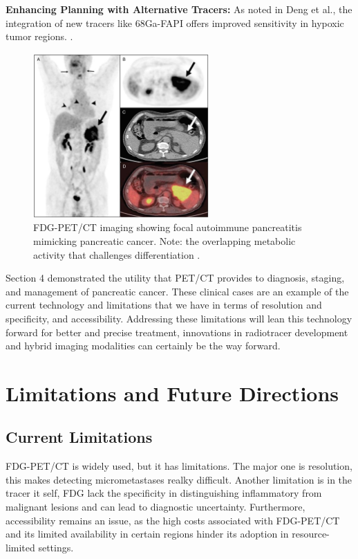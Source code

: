 \documentclass[11pt]{article} %
\begin{document}
\textbf{Enhancing Planning with Alternative Tracers:} As noted in Deng et al., the integration of new tracers like 68Ga-FAPI offers improved sensitivity in hypoxic tumor regions. \cite{Deng2021}.

\begin{figure}[H]
    \centering
    \includegraphics[width=0.6\textwidth]{assets/Zheng1.png}
    \caption{FDG-PET/CT imaging showing focal autoimmune pancreatitis mimicking pancreatic cancer. Note: the overlapping metabolic activity that challenges differentiation \cite{Zheng2018}.}
    \label{fig:Zheng1}
\end{figure}


Section 4 demonstrated the utility that PET/CT provides to diagnosis, staging, and management of pancreatic cancer. These clinical cases are an example of the current technology and limitations that we have in terms of resolution and specificity, and accessibility. Addressing these limitations will lean this technology forward for better and precise treatment, innovations in radiotracer development and hybrid imaging modalities can certainly be the way forward.

\section{Limitations and Future Directions}

\subsection{Current Limitations}

FDG-PET/CT is widely used, but it has limitations. The major one is resolution, this makes detecting micrometastases realky difficult. Another limitation is in the tracer it self, FDG lack the specificity in distinguishing inflammatory from malignant lesions and can lead to diagnostic uncertainty. Furthermore, accessibility remains an issue, as the high costs associated with FDG-PET/CT and its limited availability in certain regions hinder its adoption in resource-limited settings.
\end{document}
